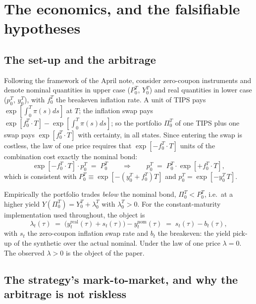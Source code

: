 \documentclass[11pt]{article}
\begin{document}
\section{The economics, and the falsifiable hypotheses}

\subsection{The set-up and the arbitrage}

Following the framework of the April note, consider zero-coupon instruments and denote nominal quantities in upper case ($P_0^T$, $Y_0^T$) and real quantities in lower case ($p_0^T$, $y_0^T$), with $f_0^T$ the breakeven inflation rate. A unit of TIPS pays $\exp[\int_0^T\pi(s)ds]$ at $T$; the inflation swap pays $\exp[f_0^T\cdot T]-\exp[\int_0^T\pi(s)ds]$; so the portfolio $\Pi_0^T$ of one TIPS plus one swap pays $\exp[f_0^T\cdot T]$ with certainty, in all states. Since entering the swap is costless, the law of one price requires that $\exp[-f_0^T\cdot T]$ units of the combination cost exactly the nominal bond:
\begin{equation}
\exp\!\left[-f_0^T\cdot T\right]\cdot p_0^T \;=\; P_0^T
\qquad\Longrightarrow\qquad
p_0^T \;=\; P_0^T\cdot\exp\!\left[+f_0^T\cdot T\right],
\label{eq:loop}
\end{equation}
which is consistent with $P_0^T\equiv\exp[-(y_0^T+f_0^T)T]$ and $p_0^T=\exp[-y_0^T\,T]$.

Empirically the portfolio trades \emph{below} the nominal bond, $\Pi_0^T<P_0^T$, i.e.\ at a higher yield $Y(\Pi_0^T)=Y_0^T+\lambda_0^T$ with $\lambda_0^T>0$. For the constant-maturity implementation used throughout, the object is
\begin{equation}
\lambda_t(\tau)\;=\;\big(y^{\text{real}}_t(\tau)+s_t(\tau)\big)-y^{\text{nom}}_t(\tau)\;=\;s_t(\tau)-b_t(\tau),
\label{eq:basis}
\end{equation}
with $s_t$ the zero-coupon inflation swap rate and $b_t$ the breakeven: the yield pick-up of the synthetic over the actual nominal. Under the law of one price $\lambda=0$. The observed $\lambda>0$ is the object of the paper.

\subsection{The strategy's mark-to-market, and why the arbitrage is not riskless}
\end{document}
